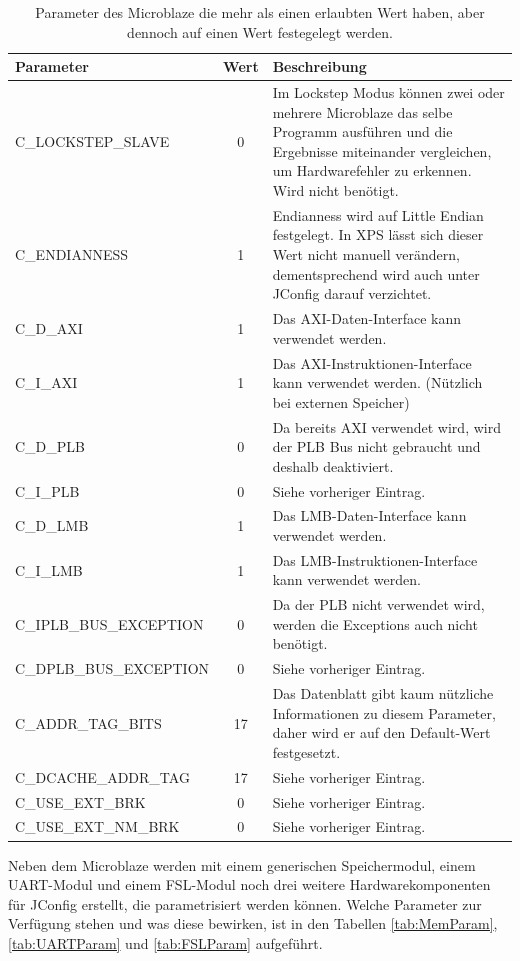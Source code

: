 \begin{table}[ht!]
	\begin{tabular}{|l|c|p{10cm}|}
		\hline \textbf{Parameter} & \textbf{Wert} & \textbf{Beschreibung} \\ 
		\hline C\_LOCKSTEP\_SLAVE & 0 & Im Lockstep Modus können zwei oder mehrere \newline Microblaze das selbe Programm ausführen und die Ergebnisse miteinander vergleichen, um Hardwarefehler zu erkennen. Wird nicht benötigt.\\ 
		\hline C\_ENDIANNESS & 1 & Endianness wird auf Little Endian festgelegt. In XPS lässt sich dieser Wert nicht manuell verändern, dementsprechend wird auch unter JConfig darauf verzichtet.\\ 
		\hline C\_D\_AXI & 1 & Das AXI-Daten-Interface kann verwendet werden. \\ 
		\hline C\_I\_AXI & 1 & Das AXI-Instruktionen-Interface kann verwendet werden. (Nützlich bei externen Speicher) \\ 
		\hline C\_D\_PLB & 0 & Da bereits AXI verwendet wird, wird der PLB Bus nicht gebraucht und deshalb deaktiviert. \\ 
		\hline C\_I\_PLB & 0 & Siehe vorheriger Eintrag. \\ 
		\hline C\_D\_LMB & 1 & Das LMB-Daten-Interface kann verwendet werden. \\ 
		\hline C\_I\_LMB & 1 & Das LMB-Instruktionen-Interface kann verwendet werden. \\ 
		\hline C\_IPLB\_BUS\_EXCEPTION & 0 & Da der PLB nicht verwendet wird, werden die Exceptions auch nicht benötigt. \\ 
		\hline C\_DPLB\_BUS\_EXCEPTION & 0 & Siehe vorheriger Eintrag. \\ 
		\hline C\_ADDR\_TAG\_BITS & 17 & Das Datenblatt gibt kaum nützliche Informationen zu diesem Parameter, daher wird er auf den Default-Wert festgesetzt. \\ 
		\hline C\_DCACHE\_ADDR\_TAG & 17 & Siehe vorheriger Eintrag. \\ 
		\hline C\_USE\_EXT\_BRK & 0 & Siehe vorheriger Eintrag. \\ 
		\hline C\_USE\_EXT\_NM\_BRK & 0 & Siehe vorheriger Eintrag. \\ 
		\hline 
	\end{tabular}
	\centering
	\caption{Parameter des Microblaze die mehr als einen erlaubten Wert haben, aber dennoch auf einen Wert festegelegt werden.}
	\label{tab:MicParam}
\end{table}
Neben dem Microblaze werden mit einem generischen Speichermodul, einem UART-Modul und einem FSL-Modul noch drei weitere Hardwarekomponenten für JConfig erstellt, die parametrisiert werden können. Welche Parameter zur Verfügung stehen und was diese bewirken, ist in den Tabellen \ref{tab:MemParam}, \ref{tab:UARTParam} und \ref{tab:FSLParam} aufgeführt.

